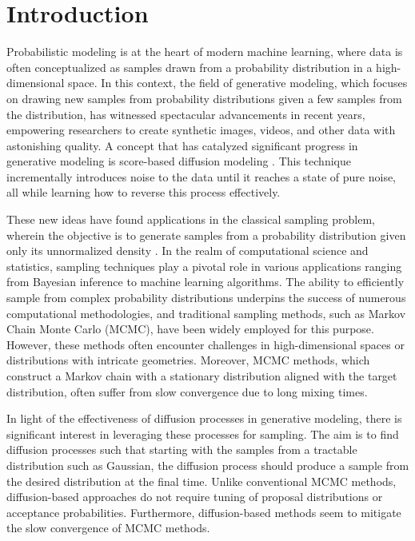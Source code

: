 \section{Introduction}

Probabilistic modeling is at the heart of modern machine learning, where data is often conceptualized as samples drawn from a probability distribution in a high-dimensional space. 
In this context, the field of generative modeling, which focuses on drawing new samples from probability distributions given a few samples from the distribution, has witnessed spectacular advancements in recent years, empowering researchers to create synthetic images, videos, and other data with astonishing quality. A concept that has catalyzed significant progress in generative modeling is score-based diffusion modeling \cite{song_generative_2019,song_score-based_2021,ho_denoising_2020}. This technique incrementally introduces noise to the data until it reaches a state of pure noise, all while learning how to reverse this process effectively. 

These new ideas have found applications in the classical sampling problem, wherein the objective is to generate samples from a probability distribution given only its unnormalized density \cite{zhang_path_2022,berner_optimal_2023,vargas_denoising_2022,richter_improved_2023,grenioux_stochastic_2024,huang_reverse_2023}. 
In the realm of computational science and statistics, sampling techniques play a pivotal role in various applications ranging from Bayesian inference to machine learning algorithms. The ability to efficiently sample from complex probability distributions underpins the success of numerous computational methodologies, and traditional sampling methods, such as Markov Chain Monte Carlo (MCMC), have been widely employed for this purpose. However, these methods often encounter challenges in high-dimensional spaces or distributions with intricate geometries. Moreover, MCMC methods, which construct a Markov chain with a stationary distribution aligned with the target distribution, often suffer from slow convergence due to long mixing times.

In light of the effectiveness of diffusion processes in generative modeling, there is significant interest in leveraging these processes for sampling.
The aim is to find diffusion processes such that starting with the samples from a tractable distribution such as Gaussian, the diffusion process should produce a sample from the desired distribution at the final time. Unlike conventional MCMC methods, diffusion-based approaches do not require tuning of proposal distributions or acceptance probabilities. Furthermore, diffusion-based methods seem to mitigate the slow convergence of MCMC methods.

